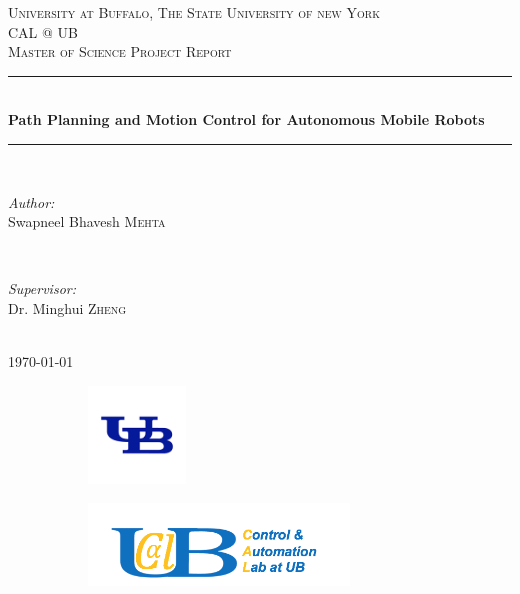 \documentclass[12pt]{article}
\begin{document}
\begin{titlepage}
\newcommand{\HRule}{\rule{\linewidth}{0.5mm}}
\center 
\textsc{\LARGE University at Buffalo, The State University of new York}\\[1.5cm] 
\textsc{\Large CAL @ UB}\\[0.5cm] 
\textsc{\large Master of Science Project Report}\\[0.5cm] 
\HRule \\[0.3cm]
{ \LARGE \bfseries Path Planning and Motion Control for Autonomous Mobile Robots}\\[0.3cm] 
\HRule \\[1.2 cm]
\begin{minipage}{0.4\textwidth}
\begin{flushleft} \large
\emph{Author:}\\
Swapneel Bhavesh \textsc{Mehta} %
\end{flushleft}
\end{minipage}
~
\begin{minipage}{0.4\textwidth}
\begin{flushright} \large
\emph{Supervisor:} \\
Dr. Minghui \textsc{Zheng}
\end{flushright}
\end{minipage}\\[2cm]
{\large \today}\\[2 cm] 
\begin{figure}[ht]
\begin{subfigure}{0.5\textwidth}
    \includegraphics[width=0.6\linewidth, height=2.6cm]{UB_LOGO.png} 
\end{subfigure}
\begin{subfigure}{0.5\textwidth}
\includegraphics[width=0.6\linewidth, height=2.2cm]{CAL@UB.jpeg}
\end{subfigure}
\end{figure}

\vfill
\end{titlepage}
\end{document}
